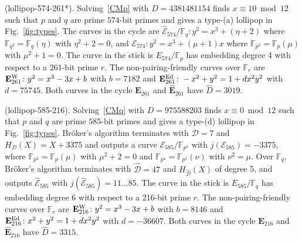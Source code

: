 \documentclass[version=preprint]{iacrcc}
\newcommand{\F}{\mathbb{F}}
\newcommand{\EC}{\mathcal{E}}
\newcommand{\D}{\mathcal{D}}
\begin{document}
\begin{example}(\textsf{lollipop-574-261}*). \label{example:574-261} Solving~\eqref{CMp} with $D=4381481154$ finds $x \equiv 10 \bmod{12}$ such that $p$ and $q$ are prime $574$-bit primes and gives a type-(a) lollipop in Fig.~\ref{fig:types}. The curves in the cycle are $\hat{\EC}_{574}/\F_q \colon y^2=x^3+(\eta+2)$ where  $\F_{q^2}=\F_q(\eta)$ with $\eta^2+2=0$, and ${\EC}_{574} \colon y^2=x^3+(\mu+1)x$ where $\F_{p^2}=\F_p(\mu)$ with $\mu^2+1=0$. The curve in the stick is $E_{574}/\F_p$ has embedding degree 4 with respect to a 261-bit prime $r$. The non-pairing-friendly curves over $\F_r$ are $\mathbf{E}_{261}^{\rm W} \colon y^2=x^3-3x+b$ with $b=7182$ and $\mathbf{E}_{261}^{\rm Ed} \colon -x^2+y^2=1+dx^2y^2$ with $d=75745$. Both curves in the cycle $\mathbf{E}_{261}$ and $\hat{\mathbf{E}}_{261}$ have $\hat{D}=3019$. 
\end{example}

\begin{example}(\textsf{lollipop-585-216}). \label{example:585-216} Solving~\eqref{CMq} with $D=975588203$ finds $x \equiv 0 \bmod{12}$ such that $p$ and $q$ are prime $585$-bit primes and gives a type-(d) lollipop in Fig.~\ref{fig:types}. Br{\"o}ker's algorithm terminates with $\D=7$ and $H_\D(X)=  X+3375$ and outputs a curve ${\EC}_{585}/\F_{p^4}$ with $j({\EC}_{585})=-3375$, where $\F_{p^2}=\F_p(\mu)$ with $\mu^2+2=0$ and $\F_{p^4}=\F_{p^2}(\nu)$ with $\nu^2=\mu$.  Over $\F_q$, Br{\"o}ker's algorithm terminates with $\hat{\D}=47$ and $H_{\hat{\D}}(X)$ of degree 5, and outputs $\hat{\EC}_{585}$ with $j(\hat{\EC}_{585})=11 \dots 85$. The curve in the stick is $E_{585}/\F_q$ has embedding degree 6 with respect to a 216-bit prime $r$. The non-pairing-friendly curves over $\F_r$ are $\mathbf{E}_{216}^{\rm W} \colon y^2=x^3-3x+b$ with $b=8146$ and $\mathbf{E}_{216}^{\rm Ed} \colon x^2+y^2=1+dx^2y^2$ with $d=-36607$. Both curves in the cycle $\mathbf{E}_{216}$ and $\hat{\mathbf{E}}_{216}$ have $\hat{D}=3315$. 
\end{example}
\end{document}
